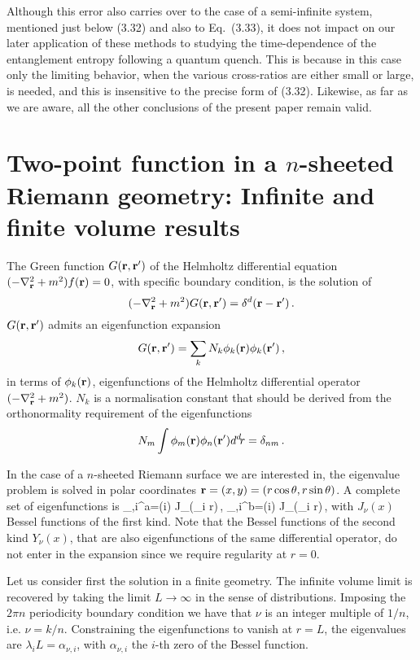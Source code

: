 \documentclass[preprint,aps]{revtex4}
\begin{document}
Although this error also carries over to the case of a
semi-infinite system, mentioned just below (3.32) and also to
Eq.~(3.33), it does not impact on our later application of these
methods to studying the time-dependence of the entanglement
entropy following a quantum quench\cite{cc3}. This is because in
this case only the limiting behavior, when the various
cross-ratios are either small or large, is needed, and this is
insensitive to the precise form of (3.32). Likewise, as far as we
are aware, all the other conclusions of the present paper remain
valid.




\appendix

\section{Two-point function in a $n$-sheeted Riemann geometry:
Infinite and finite volume results}

The Green function $G({\bf r,r'})$ of the Helmholtz differential equation
$(-\nabla^2_{\bf r}+m^2)f({\bf r})=0$, with specific boundary condition,
is the solution of
$$
(-\nabla^2_{\bf r}+m^2)G({\bf r,r'})=\delta^d({\bf r-r'})\,.
$$
$G({\bf r,r'})$ admits an eigenfunction expansion
$$
G({\bf r,r'})=\sum_k N_k \phi_k({\bf r}) \phi_k({\bf r'})\,,
$$
in terms of $\phi_k({\bf r})$, eigenfunctions of the Helmholtz differential
operator $(-\nabla^2_{\bf r}+m^2)$.
$N_k$ is a  normalisation constant that should be derived from the
orthonormality requirement of the eigenfunctions
$$
N_m\int \phi_m({\bf r})\phi_n({\bf r'})d^d\!r=\delta_{nm}\,.
$$

In the case of a $n$-sheeted Riemann surface we are interested in,
the eigenvalue problem is solved in polar coordinates
${\bf r}=(x,y)=(r\cos\theta,r\sin\theta)$.
A complete set of eigenfunctions is
\be
\phi_{\nu,i}^a=\cos({i\nu \theta}) J_\nu(\lambda_i r)\,,\qquad
\phi_{\nu,i}^b=\sin({i\nu \theta}) J_\nu(\lambda_i r)\,,
\ee
with $J_\nu(x)$ Bessel functions of the first kind.
Note that the Bessel functions of the second kind $Y_\nu(x)$, that are also
eigenfunctions of the same differential operator, do not enter in
the expansion since we require regularity at $r=0$.

Let us consider first the solution in a finite geometry.
The infinite volume limit is recovered by taking the limit
$L\rightarrow \infty$ in the sense of distributions.
Imposing the $2\pi n$ periodicity boundary condition we have that $\nu$ is
an integer multiple of $1/n$, i.e. $\nu=k/n$.
Constraining the eigenfunctions to vanish at $r=L$, the eigenvalues
are $\lambda_i L=\alpha_{\nu,i}$, with $\alpha_{\nu,i}$ the $i$-th zero of
the Bessel function.
\end{document}

